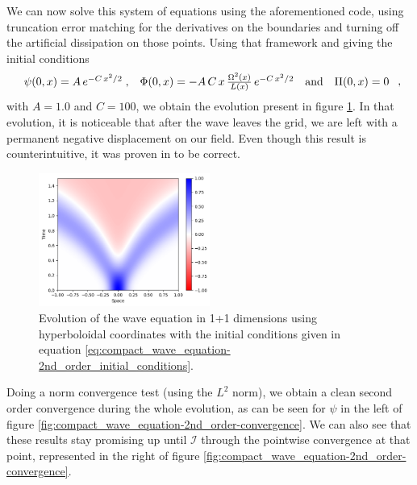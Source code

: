 We can now solve this system of equations using the aforementioned code, using truncation error matching for the derivatives on the boundaries and turning off the artificial dissipation on those points. Using that framework and giving the initial conditions
\begin{equation}
    \begin{array}{c c c c}
        \psi(0,x) = A \, e^{-C \, x^2/2} \; , & \Phi(0,x) = - A \,C \, x \, \frac{\Omega^2(x)}{L(x)} \, e^{-C \, x^2/2} & \text{and} & \Pi(0,x) = 0
    \end{array} \; ,
    \label{eq:compact_wave_equation-2nd_order_initial_conditions}
\end{equation}
with $A = 1.0$ and $C = 100$, we obtain the evolution present in figure \ref{fig:compact_wave_equation-2nd_order}. In that evolution, it is noticeable that after the wave leaves the grid, we are left with a permanent negative displacement on our field. Even though this result is counterintuitive, it was proven in \cite{} to be correct.

\begin{figure}[h]
    \centering
    \includegraphics[width=0.5\textwidth]{Images/Wave_Equation_1+1-Solution.png}
    \caption{Evolution of the wave equation in 1+1 dimensions using hyperboloidal coordinates with the initial conditions given in equation \eqref{eq:compact_wave_equation-2nd_order_initial_conditions}.}
    \label{fig:compact_wave_equation-2nd_order}
\end{figure}

Doing a norm convergence test (using the $L^2$ norm), we obtain a clean second order convergence during the whole evolution, as can be seen for $\psi$ in the left of figure \ref{fig:compact_wave_equation-2nd_order-convergence}. We can also see that these results stay promising up until $\mathscr{I}$ through the pointwise convergence at that point, represented in the right of figure \ref{fig:compact_wave_equation-2nd_order-convergence}.

